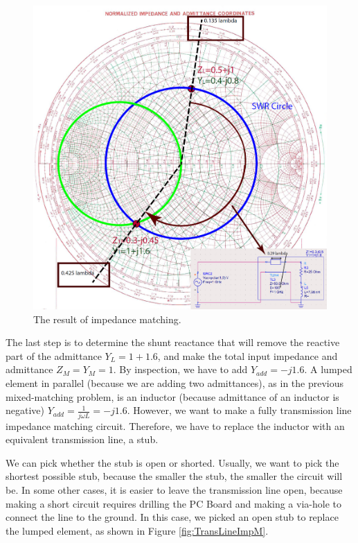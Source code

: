 \documentclass{ximera}
\begin{document}
\begin{figure}[htbp]
\begin{center}
\includegraphics[scale=0.4]{../jpg/Match2.jpg}
\end{center}
\caption{The result of impedance matching.}
\label{fig:AddingSectionOfLine}
\end{figure}

The last step is to determine the shunt reactance that will remove the reactive part of the admittance $Y_L=1+1.6$, and make the total input impedance and admittance $Z_M=Y_M=1$. By inspection, we have to add $Y_{add}=-j1.6$. A lumped element in parallel (because we are adding two admittances), as in the previous mixed-matching problem, is an inductor (because admittance of an inductor is negative)  $Y_{add}=\frac{1}{j \omega L}=-j1.6$. However, we want to make a fully transmission line impedance matching circuit. Therefore, we have to replace the inductor with an equivalent transmission line, a stub. 

We can pick whether the stub is open or shorted. Usually, we want to pick the shortest possible stub, because the smaller the stub, the smaller the circuit will be. In some other cases, it is easier to leave the transmission line open, because making a short circuit requires drilling the PC Board and making a via-hole to connect the line to the ground. In this case, we picked an open stub to replace the lumped element, as shown in Figure \ref{fig:TransLineImpM}.
\end{document}
